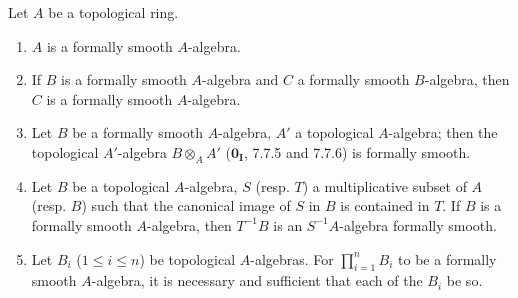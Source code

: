 \begin{proposition}[19.3.5]
\label{0.19.3.5}
Let $A$ be a topological ring.
\begin{enumerate}
  \item[\textup{(i)}] $A$ is a formally smooth $A$-algebra.
  \item[\textup{(ii)}] If $B$ is a formally smooth $A$-algebra and $C$ a formally smooth $B$-algebra, then $C$ is a formally smooth $A$-algebra.
  \item[\textup{(iii)}] Let $B$ be a formally smooth $A$-algebra, $A'$ a topological $A$-algebra;
  then the topological $A'$-algebra $B\otimes_A A'$ ($\mathbf{0_I}$, 7.7.5 and 7.7.6) is formally smooth.
  \item[\textup{(iv)}] Let $B$ be a topological $A$-algebra, $S$ \textup{(resp. $T$)} a multiplicative subset of $A$ \textup{(resp. $B$)} such that the canonical image of $S$ in $B$ is contained in $T$.
  If $B$ is a formally smooth $A$-algebra, then $T^{-1}B$ is an $S^{-1}A$-algebra formally smooth.
  \item[\textup{(v)}] Let $B_i$ \textup{($1\leq i\leq n$)} be topological $A$-algebras.
  For $\prod_{i=1}^n B_i$ to be a formally smooth $A$-algebra, it is necessary and sufficient that each of the $B_i$ be so.
\end{enumerate}
\end{proposition}

